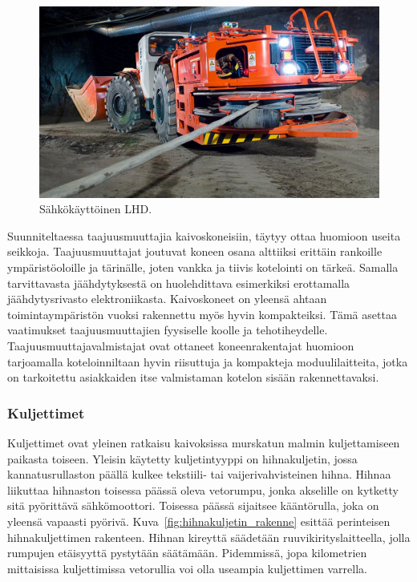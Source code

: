 \documentclass[finnish,12pt,a4paper,pdftex,elec,utf8]{aaltothesis}
\begin{document}
\\\\
\begin{figure}[H]
	\begin{center}
	\includegraphics[scale=0.35]{LHD}
	\end{center}
	\caption{Sähkökäyttöinen LHD.
		\cite{LHD}}
	\label{fig:LHD}
\end{figure}
\noindent
Suunniteltaessa taajuusmuuttajia kaivoskoneisiin, täytyy ottaa huomioon useita seikkoja. Taajuusmuuttajat joutuvat koneen osana alttiiksi erittäin rankoille ympäristöoloille ja tärinälle, joten vankka ja tiivis kotelointi on tärkeä. Samalla tarvittavasta jäähdytyksestä on huolehdittava esimerkiksi erottamalla jäähdytysrivasto elektroniikasta. Kaivoskoneet on yleensä ahtaan toimintaympäristön vuoksi rakennettu myös hyvin kompakteiksi. Tämä asettaa vaatimukset taajuusmuuttajien fyysiselle koolle ja tehotiheydelle. Taajuusmuuttajavalmistajat ovat ottaneet koneenrakentajat huomioon tarjoamalla koteloinniltaan hyvin riisuttuja ja kompakteja moduulilaitteita, jotka on tarkoitettu asiakkaiden itse valmistaman kotelon sisään rakennettavaksi. \cite{MyyntiHaastattelu}

\subsubsection{Kuljettimet}
Kuljettimet ovat yleinen ratkaisu kaivoksissa murskatun malmin kuljettamiseen paikasta toiseen. Yleisin käytetty kuljetintyyppi on hihnakuljetin, jossa kannatusrullaston päällä kulkee tekstiili- tai vaijerivahvisteinen hihna. Hihnaa liikuttaa hihnaston toisessa päässä oleva vetorumpu, jonka akselille on kytketty sitä pyörittävä sähkömoottori. Toisessa päässä sijaitsee kääntörulla, joka on yleensä vapaasti pyörivä. Kuva~\ref{fig:hihnakuljetin_rakenne} esittää perinteisen hihnakuljettimen rakenteen. Hihnan kireyttä säädetään ruuvikirityslaitteella, jolla rumpujen etäisyyttä pystytään säätämään. Pidemmissä, jopa kilometrien mittaisissa kuljettimissa vetorullia voi olla useampia kuljettimen varrella. \cite{Hakapää}
\end{document}
